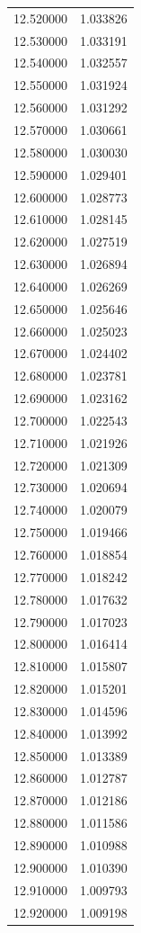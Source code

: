 \begin{tabular}{rr}
12.520000 & 1.033826 \\
12.530000 & 1.033191 \\
12.540000 & 1.032557 \\
12.550000 & 1.031924 \\
12.560000 & 1.031292 \\
12.570000 & 1.030661 \\
12.580000 & 1.030030 \\
12.590000 & 1.029401 \\
12.600000 & 1.028773 \\
12.610000 & 1.028145 \\
12.620000 & 1.027519 \\
12.630000 & 1.026894 \\
12.640000 & 1.026269 \\
12.650000 & 1.025646 \\
12.660000 & 1.025023 \\
12.670000 & 1.024402 \\
12.680000 & 1.023781 \\
12.690000 & 1.023162 \\
12.700000 & 1.022543 \\
12.710000 & 1.021926 \\
12.720000 & 1.021309 \\
12.730000 & 1.020694 \\
12.740000 & 1.020079 \\
12.750000 & 1.019466 \\
12.760000 & 1.018854 \\
12.770000 & 1.018242 \\
12.780000 & 1.017632 \\
12.790000 & 1.017023 \\
12.800000 & 1.016414 \\
12.810000 & 1.015807 \\
12.820000 & 1.015201 \\
12.830000 & 1.014596 \\
12.840000 & 1.013992 \\
12.850000 & 1.013389 \\
12.860000 & 1.012787 \\
12.870000 & 1.012186 \\
12.880000 & 1.011586 \\
12.890000 & 1.010988 \\
12.900000 & 1.010390 \\
12.910000 & 1.009793 \\
12.920000 & 1.009198 \\

\end{tabular}
